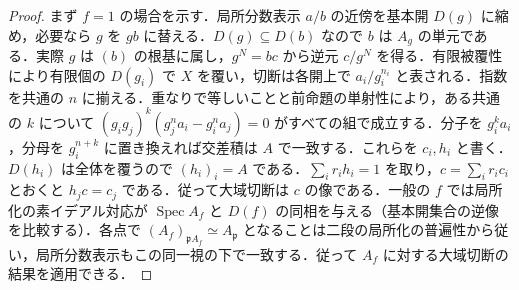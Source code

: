 \begin{proof}
まず $f=1$ の場合を示す．局所分数表示 $a/b$ の近傍を基本開 $D(g)$ に縮め，必要なら $g$ を $gb$ に替える．$D(g)\subseteq D(b)$ なので $b$ は $A_g$ の単元である．実際 $g$ は $(b)$ の根基に属し，$g^N=bc$ から逆元 $c/g^N$ を得る．有限被覆性により有限個の $D(g_i)$ で $X$ を覆い，切断は各開上で $a_i/g_i^{n_i}$ と表される．指数を共通の $n$ に揃える．重なりで等しいことと前命題の単射性により，ある共通の $k$ について $(g_ig_j)^k(g_j^na_i-g_i^na_j)=0$ がすべての組で成立する．分子を $g_i^ka_i$，分母を $g_i^{n+k}$ に置き換えれば交差積は $A$ で一致する．これらを $c_i,h_i$ と書く．$D(h_i)$ は全体を覆うので $(h_i)_i=A$ である．$\sum_i r_i h_i=1$ を取り，$c=\sum_i r_i c_i$ とおくと $h_jc=c_j$ である．従って大域切断は $c$ の像である．一般の $f$ では局所化の素イデアル対応が $\operatorname{Spec}A_f$ と $D(f)$ の同相を与える（基本開集合の逆像を比較する）．各点で $(A_f)_{\mathfrak pA_f}\simeq A_{\mathfrak p}$ となることは二段の局所化の普遍性から従い，局所分数表示もこの同一視の下で一致する．従って $A_f$ に対する大域切断の結果を適用できる．
\end{proof}
